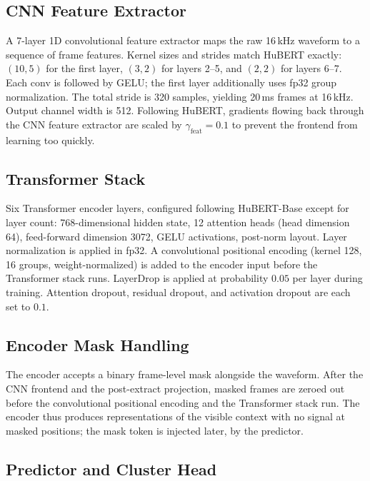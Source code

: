 \documentclass[9pt,twocolumn]{article}
\theoremstyle{plain}
\theoremstyle{definition}
\theoremstyle{remark}
\begin{document}
\subsection{CNN Feature Extractor}

A 7-layer 1D convolutional feature extractor maps the raw 16\,kHz waveform to a sequence of frame features. Kernel sizes and strides match HuBERT exactly: $(10,5)$ for the first layer, $(3,2)$ for layers 2--5, and $(2,2)$ for layers 6--7. Each conv is followed by GELU; the first layer additionally uses fp32 group normalization. The total stride is 320 samples, yielding 20\,ms frames at 16\,kHz. Output channel width is 512. Following HuBERT, gradients flowing back through the CNN feature extractor are scaled by $\gamma_{\text{feat}}\!=\!0.1$ to prevent the frontend from learning too quickly.

\subsection{Transformer Stack}

Six Transformer encoder layers, configured following HuBERT-Base except for layer count: 768-dimensional hidden state, 12 attention heads (head dimension 64), feed-forward dimension 3072, GELU activations, post-norm layout. Layer normalization is applied in fp32. A convolutional positional encoding (kernel 128, 16 groups, weight-normalized) is added to the encoder input before the Transformer stack runs. LayerDrop is applied at probability $0.05$ per layer during training. Attention dropout, residual dropout, and activation dropout are each set to $0.1$.

\subsection{Encoder Mask Handling}

The encoder accepts a binary frame-level mask alongside the waveform. After the CNN frontend and the post-extract projection, masked frames are zeroed out before the convolutional positional encoding and the Transformer stack run. The encoder thus produces representations of the visible context with no signal at masked positions; the mask token is injected later, by the predictor.

\subsection{Predictor and Cluster Head}
\end{document}
